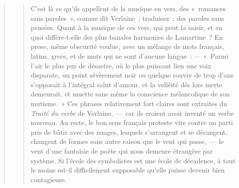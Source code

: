 \documentclass[french,twoside]{book} %
\begin{document}
\begin{verse}
\begin{verse}
\noindent C’est là ce qu’ils appellent de la musique en vers, des « romances sans paroles », comme dit Verlaine ; traduisez : des paroles sans pensées. Quant à la musique de ces vers, qui peut la saisir, et en quoi diffère-t-elle des plus banales harmonies de Lamartine ? En prose, même obscurité voulue, avec un mélange de mots français, latins, grecs, et de mots qui ne sont d’aucune langue : — « Parmi l’air le plus pur de désastre, où le plus puissant lien une voix disparate, un point sévèrement noir ou quelque rouvre de trop d’ans s’opposait à l’intégral salut d’amour, et la velléité dès lors inerte demeurait, et muette sans même la conscience mélancolique de son mutisme. » Ces phrases relativement fort claires sont extraites du \emph{Traité du verbe} de Verlaine, — car ils croient avoir inventé un verbe nouveau. Au reste, le bon sens français proteste vite contre un parti pris de bâtir avec des nuages, lesquels s’arrangent et se dérangent, changent de formes sans autre raison que le vent qui passe, — le vent d’une fantaisie de poète qui nous demeure étrangère par système. Si l’école des symbolistes est une école de décadence, à tout le moins est-il difficilement supposable qu’elle puisse devenir bien contagieuse.\par

\end{verse}
\end{verse}
\end{document}
